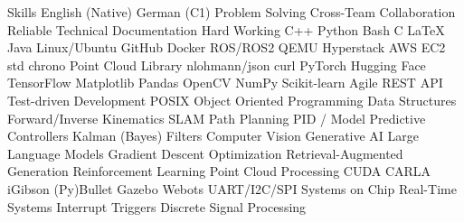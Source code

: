 
\begin{rubric}{Skills}
\entry*[Languages]
	\skilldotfirst English (Native) \skilldot German (C1)
\entry*[Strengths] 
	\skilldotfirst Problem Solving \skilldot Cross-Team Collaboration \skilldot Reliable \newline \skilldotfirst Technical Documentation \skilldot Hard Working %
\entry*[Coding]
	\skilldotfirst C++ \skilldot Python \skilldot Bash \skilldot C \skilldot LaTeX \skilldot Java
\entry*[Software] 
	\skilldotfirst Linux/Ubuntu \skilldot GitHub \skilldot Docker \skilldot ROS/ROS2 \skilldot QEMU \newline \skilldotfirst Hyperstack \skilldot AWS EC2
 \entry*[Libraries (C++)] 
 	\skilldotfirst std \skilldot chrono \skilldot Point Cloud Library \skilldot nlohmann/json \skilldot curl
\entry*[Libraries (Py)] 
	\skilldotfirst PyTorch \skilldot Hugging Face \skilldot TensorFlow \skilldot Matplotlib \skilldot Pandas \newline \skilldot OpenCV \skilldot NumPy \skilldot Scikit-learn
\entry*[Knowledge] 	
	\skilldotfirst Agile \skilldot REST API \skilldot Test-driven Development \skilldot POSIX  \newline \skilldotfirst Object Oriented Programming \skilldot Data Structures 
\entry*[Robotics]
	\skilldotfirst Forward/Inverse Kinematics \skilldot SLAM \skilldot Path Planning \newline \skilldotfirst PID / Model Predictive Controllers \skilldot Kalman (Bayes) Filters
	\skilldotfirst Computer Vision \skilldot Generative AI \skilldot Large Language Models \newline \skilldotfirst Gradient Descent Optimization \skilldot Retrieval-Augmented Generation \newline \skilldotfirst Reinforcement Learning  \skilldot Point Cloud Processing \skilldot CUDA
\entry*[Simulators] 
	\skilldotfirst CARLA \skilldot iGibson \skilldot (Py)Bullet \skilldot Gazebo \skilldot Webots
\entry*[Mictrocontrollers]
	\skilldotfirst UART/I2C/SPI \skilldot Systems on Chip \skilldot Real-Time Systems \newline \skilldotfirst Interrupt Triggers \skilldot Discrete Signal Processing

\end{rubric}
